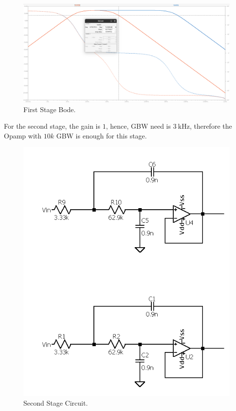\begin{figure}[H]
    \centering
    \includegraphics*[scale = 0.25]{Images/P2BodeGBWStg1.png}
    \caption{First Stage Bode.}
    \label{fig:P2Stg1Bode}
\end{figure}

For the second stage, the gain is $1$, hence, GBW need is $\SI{3}{\kilo\hertz}$, therefore the Opamp with $10k$ GBW is enough for this stage.

\begin{figure}[H]
    \centering
    \includegraphics*[scale = 0.4]{Images/P2CircGBWStg2.png}
    \caption{Second Stage Circuit.}
\end{figure}

